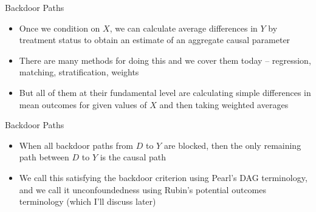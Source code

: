 \documentclass{beamer}
\begin{document}
\begin{frame}{Backdoor Paths}

  \begin{itemize}
    \item Once we condition on $X$, we can calculate average differences in $Y$ by treatment status to obtain an estimate of an aggregate causal parameter
    \item There are many methods for doing this and we cover them today -- regression, matching, stratification, weights
    \item But all of them at their fundamental level are calculating simple differences in mean outcomes for given values of $X$ and then taking weighted averages

  \end{itemize}

  \begin{center}
  \end{center}

\end{frame}


\begin{frame}{Backdoor Paths}

  \begin{itemize}

	\item When all backdoor paths from $D$ to $Y$ are blocked, then the only remaining path between $D$ to $Y$ is the causal path
	\item We call this satisfying the backdoor criterion using Pearl's DAG terminology, and we call it unconfoundedness using Rubin's potential outcomes terminology (which I'll discuss later)

  \end{itemize}

  \begin{center}
  \end{center}

\end{frame}
\end{document}
